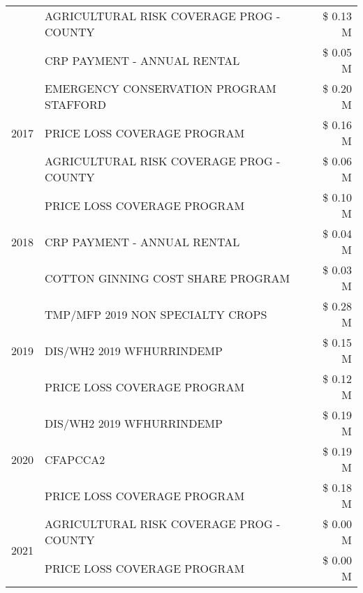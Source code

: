 \begin{tabular}{llr}
 & AGRICULTURAL RISK COVERAGE PROG - COUNTY & \$ 0.13 M \\
 & CRP PAYMENT - ANNUAL RENTAL & \$ 0.05 M \\
\cline{1-3}
\multirow[t]{3}{*}{2017} & EMERGENCY CONSERVATION PROGRAM STAFFORD & \$ 0.20 M \\
 & PRICE LOSS COVERAGE PROGRAM & \$ 0.16 M \\
 & AGRICULTURAL RISK COVERAGE PROG - COUNTY & \$ 0.06 M \\
\cline{1-3}
\multirow[t]{3}{*}{2018} & PRICE LOSS COVERAGE PROGRAM & \$ 0.10 M \\
 & CRP PAYMENT - ANNUAL RENTAL & \$ 0.04 M \\
 & COTTON GINNING COST SHARE PROGRAM & \$ 0.03 M \\
\cline{1-3}
\multirow[t]{3}{*}{2019} & TMP/MFP 2019 NON SPECIALTY CROPS & \$ 0.28 M \\
 & DIS/WH2 2019 WFHURRINDEMP & \$ 0.15 M \\
 & PRICE LOSS COVERAGE PROGRAM & \$ 0.12 M \\
\cline{1-3}
\multirow[t]{3}{*}{2020} & DIS/WH2 2019 WFHURRINDEMP & \$ 0.19 M \\
 & CFAPCCA2 & \$ 0.19 M \\
 & PRICE LOSS COVERAGE PROGRAM & \$ 0.18 M \\
\cline{1-3}
\multirow[t]{2}{*}{2021} & AGRICULTURAL RISK COVERAGE PROG - COUNTY & \$ 0.00 M \\
 & PRICE LOSS COVERAGE PROGRAM & \$ 0.00 M \\
\cline{1-3}
\bottomrule
\end{tabular}
